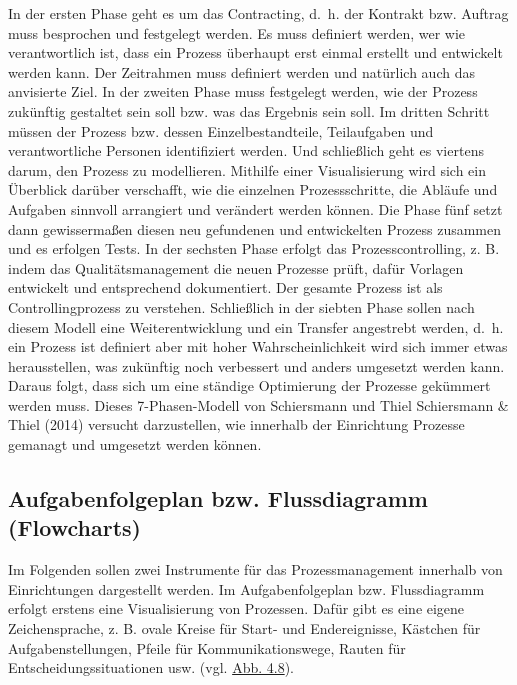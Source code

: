 \documentclass[
  letterpaper,
]{book}
\begin{document}
In der ersten Phase geht es um das Contracting, d.~h. der Kontrakt bzw.
Auftrag muss besprochen und festgelegt werden. Es muss definiert werden,
wer wie verantwortlich ist, dass ein Prozess überhaupt erst einmal
erstellt und entwickelt werden kann. Der Zeitrahmen muss definiert
werden und natürlich auch das anvisierte Ziel. In der zweiten Phase muss
festgelegt werden, wie der Prozess zukünftig gestaltet sein soll bzw.
was das Ergebnis sein soll. Im dritten Schritt müssen der Prozess bzw.
dessen Einzelbestandteile, Teilaufgaben und verantwortliche Personen
identifiziert werden. Und schließlich geht es viertens darum, den
Prozess zu modellieren. Mithilfe einer Visualisierung wird sich ein
Überblick darüber verschafft, wie die einzelnen Prozessschritte, die
Abläufe und Aufgaben sinnvoll arrangiert und verändert werden können.
Die Phase fünf setzt dann gewissermaßen diesen neu gefundenen und
entwickelten Prozess zusammen und es erfolgen Tests. In der sechsten
Phase erfolgt das Prozesscontrolling, z. B. indem das
Qualitätsmanagement die neuen Prozesse prüft, dafür Vorlagen entwickelt
und entsprechend dokumentiert. Der gesamte Prozess ist als
Controllingprozess zu verstehen. Schließlich in der siebten Phase sollen
nach diesem Modell eine Weiterentwicklung und ein Transfer angestrebt
werden, d.~h. ein Prozess ist definiert aber mit hoher
Wahrscheinlichkeit wird sich immer etwas herausstellen, was zukünftig
noch verbessert und anders umgesetzt werden kann. Daraus folgt, dass
sich um eine ständige Optimierung der Prozesse gekümmert werden muss.
Dieses 7-Phasen-Modell von Schiersmann und Thiel Schiersmann \& Thiel
(2014) versucht darzustellen, wie innerhalb der Einrichtung Prozesse
gemanagt und umgesetzt werden können.

\subsection{Aufgabenfolgeplan bzw. Flussdiagramm
(Flowcharts)}\label{aufgabenfolgeplan-bzw-flussdiagramm-flowcharts}

Im Folgenden sollen zwei Instrumente für das Prozessmanagement innerhalb
von Einrichtungen dargestellt werden. Im Aufgabenfolgeplan bzw.
Flussdiagramm erfolgt erstens eine Visualisierung von Prozessen. Dafür
gibt es eine eigene Zeichensprache, z. B. ovale Kreise für Start- und
Endereignisse, Kästchen für Aufgabenstellungen, Pfeile für
Kommunikationswege, Rauten für Entscheidungssituationen usw. (vgl.
\hyperref[figure48]{Abb. 4.8}).
\end{document}
